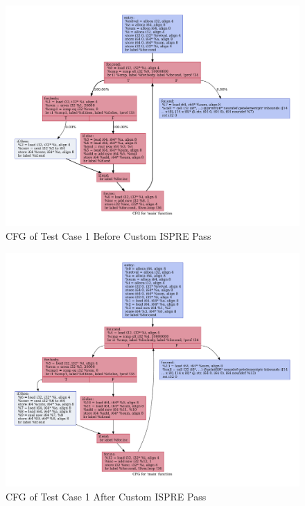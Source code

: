 \documentclass[sigplan,screen]{acmart}
\begin{document}
\begin{figure}[h]
\begin{center}
\includegraphics[width=0.95\linewidth]{ispre_test1.cfg.pdf}
\caption{CFG of Test Case 1 Before Custom ISPRE Pass}
\label{fig:no_ispre_cfg}
\end{center}
\end{figure}


\begin{figure}
\begin{center}
\includegraphics[width=0.95\linewidth]{ispre_test1.ispre.cfg.pdf}
\caption{CFG of Test Case 1 After Custom ISPRE Pass}
\label{fig:ispre_cfg}
\end{center}
\end{figure}
 
	
	
\end{document}
